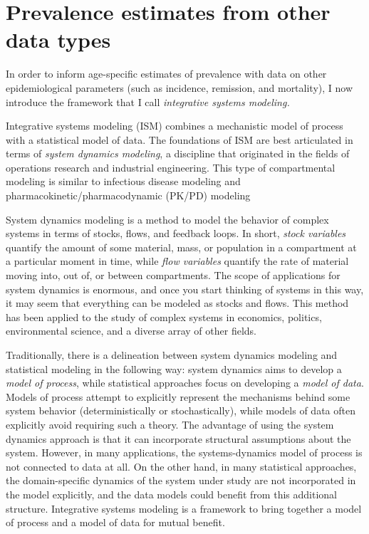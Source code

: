 \chapter{Prevalence estimates from other data types}
\label{theory-system_dynamics}

In order to inform age-specific estimates of prevalence with data on
other epidemiological parameters (such as incidence, remission, and
mortality), I now introduce the framework that I call
\emph{integrative systems modeling.}

Integrative systems modeling (ISM) combines a mechanistic model of
process with a statistical model of data.  The foundations of ISM are
best articulated in terms of \emph{system dynamics modeling}, a
discipline that originated in the fields of operations research and
industrial engineering. \cite{Forrester_Industrial_19XX,
  Forrester_Urban_1969, Forrester_World_1971, Meadows_Thinking_2008}
This type of compartmental modeling is similar to infectious disease
modeling \cite{Andersen_Infectious_19XX, Keeling_Modeling_20XX,
  Vynnycky_Introduction_20XX, Heesterbeek_Mathematical_19XX} and
pharmacokinetic/pharmacodynamic (PK/PD) modeling
\cite{Jacquez_Modeling_1999, Jacquez_Compartmental_19XX}

System dynamics modeling is a method to model the behavior of complex
systems in terms of stocks, flows, and feedback loops.  In short,
\emph{stock variables} quantify the amount of some material, mass,
or population in a compartment at a particular moment in time, while
\emph{flow variables} quantify the rate of material moving into, out
of, or between compartments. The scope of applications for system
dynamics is enormous, and once you start thinking of systems in this
way, it may seem that everything can be modeled as stocks and
flows. This method has been applied to the study of complex systems in
economics, politics, environmental science, and a diverse array of
other fields.
\cite{Meadows_Thinking_2008,Jacquez_Modeling_1999,Harte_Consider_1988,TK_feedback_in_social_science_19XX}


Traditionally, there is a delineation between system dynamics modeling
and statistical modeling in the following way: system dynamics aims to
develop a \emph{model of process}, while statistical approaches focus
on developing a \emph{model of data}. Models of process attempt to
explicitly represent the mechanisms behind some system behavior
(deterministically or stochastically), while models of data often
explicitly avoid requiring such a theory. The advantage of using the
system dynamics approach is that it can incorporate structural
assumptions about the system.  However, in many applications, the
systems-dynamics model of process is not connected to data at all.  On
the other hand, in many statistical approaches, the domain-specific
dynamics of the system under study are not incorporated in the model
explicitly, and the data models could benefit from this additional
structure.  Integrative systems modeling is a framework to bring
together a model of process and a model of data for mutual benefit.

